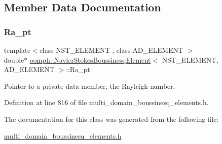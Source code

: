 \subsection{Member Data Documentation}
\mbox{\label{classoomph_1_1NavierStokesBoussinesqElement_a0f1c9b6947324c4d5386b9b68abba2d1}} 
\subsubsection{\texorpdfstring{Ra\+\_\+pt}{Ra\_pt}}
{\footnotesize\ttfamily template$<$class N\+S\+T\+\_\+\+E\+L\+E\+M\+E\+NT , class A\+D\+\_\+\+E\+L\+E\+M\+E\+NT $>$ \\
double$\ast$ \hyperlink{classoomph_1_1NavierStokesBoussinesqElement}{oomph\+::\+Navier\+Stokes\+Boussinesq\+Element}$<$ N\+S\+T\+\_\+\+E\+L\+E\+M\+E\+NT, A\+D\+\_\+\+E\+L\+E\+M\+E\+NT $>$\+::Ra\+\_\+pt\hspace{0.3cm}{\ttfamily [private]}}



Pointer to a private data member, the Rayleigh number. 



Definition at line 816 of file multi\+\_\+domain\+\_\+boussinesq\+\_\+elements.\+h.



The documentation for this class was generated from the following file\+:\begin{DoxyCompactItemize}
\item 
\hyperlink{multi__domain__boussinesq__elements_8h}{multi\+\_\+domain\+\_\+boussinesq\+\_\+elements.\+h}\end{DoxyCompactItemize}
